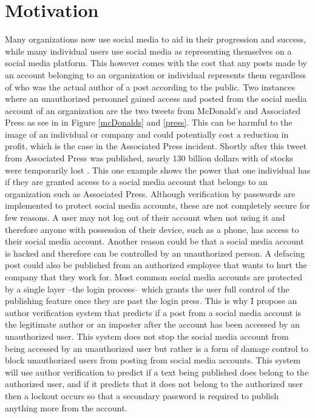 \documentclass[11pt]{article}
\begin{document}
\section{Motivation}

Many organizations now use social media to aid in their progression and success, while many individual users use social media as representing themselves on a social media platform. This however comes with the cost that any posts made by an account belonging to an organization or individual represents them regardless of who was the actual author of a post according to the public. Two instances where an unauthorized personnel gained access and posted from the social media account of an organization are the two tweets from McDonald's and Associated Press as see in in Figure \ref{mcDonalds} and \ref{press}. This can be harmful to the image of an individual or company and could potentially cost a reduction in profit, which is the case in the Associated Press incident. Shortly after this tweet from Associated Press was published, nearly 130 billion dollars with of stocks were temporarily lost \cite{financialTimes}. This one example shows the power that one individual has if they are granted access to a social media account that belongs to an organization such as Associated Press.  Although verification by passwords are implemented to protect social media accounts, these are not completely secure for few reasons. A user may not log out of their account when not using it and therefore anyone with possession of their device, such as a phone, has access to their social media account. Another reason could be that a social media account is hacked and therefore can be controlled by an unauthorized person. A defacing post could also be published from an authorized employee that wants to hurt the company that they work for. Most common social media accounts are protected by a single layer --the login process-- which grants the user full control of the publishing feature once they are past the login press. This is why I propose an author verification system that predicts if a post from a social media account is the legitimate author or an imposter after the account has been accessed by an unauthorized user. This system does not stop the social media account from being accessed by an unauthorized user but rather is a form of damage control to block unauthorized users from posting from social media accounts. This system will use author verification to predict if a text being published does belong to the authorized user, and if it predicts that it does not belong to the authorized user then a lockout occurs so that a secondary password is required to publish anything more from the account. 
\end{document}
